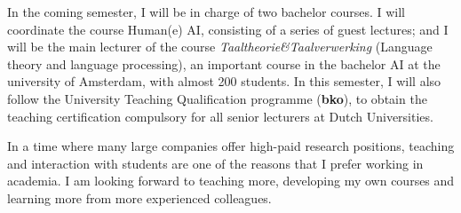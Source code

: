 \documentclass[11pt,a4paper,roman, colorlinks, linkcolor=true]{moderncv}        %
\begin{document}
In the coming semester, I will be in charge of two bachelor courses. 
I will coordinate the course Human(e) AI, consisting of a series of guest lectures; and I will be the main lecturer of the course \emph{Taaltheorie\&Taalverwerking} (Language theory and language processing), an important course in the bachelor AI at the university of Amsterdam, with almost 200 students.
In this semester, I will also follow the University Teaching Qualification programme (\textbf{bko}), to obtain the teaching certification compulsory for all senior lecturers at Dutch Universities.

In a time where many large companies offer high-paid research positions, teaching and interaction with students are one of the reasons that I prefer working in academia.
I am looking forward to teaching more, developing my own courses and learning more from more experienced colleagues.
\end{document}
